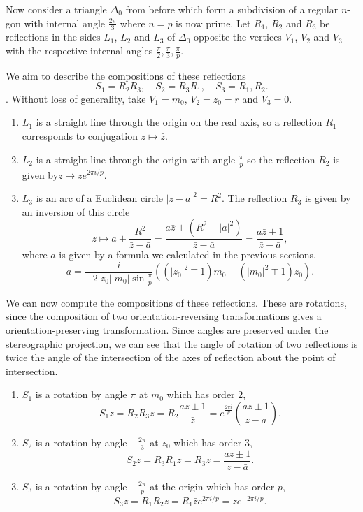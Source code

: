 \documentclass{article}
\begin{document}
Now consider a triangle \(\Delta_0\) from before which form a subdivision of a regular \(n\)-gon with internal angle \(\frac{2\pi}{3}\) where \(n = p\) is now prime. Let \(R_1\), \(R_2\) and \(R_3\) be reflections in the sides \(L_1\), \(L_2\) and \(L_3\) of \(\Delta_0\) opposite the vertices \(V_1\), \(V_2\) and \(V_3\) with the respective internal angles \(\frac{\pi}{2}, \frac{\pi}{3}, \frac{\pi}{p}\). 

We aim to describe the compositions of these reflections
\[ S_1 = R_2R_3, \quad S_2 = R_3R_1, \quad S_3 = R_1,R_2. \].
Without loss of generality, take \(V_1 = m_0\), \(V_2 = z_0 = r\) and \(V_3 = 0\). 
\begin{enumerate}
    \item \(L_1\) is a straight line through the origin on the real axis, so a reflection \(R_1\) corresponds to conjugation \(z \mapsto \bar{z}\). 

    \item \(L_2\) is a straight line through the origin with angle \(\frac{\pi}{p}\) so the reflection \(R_2\) is given by\(z \mapsto \bar{z}e^{2\pi i/p}\). 
    
    \item \(L_3\) is an arc of a Euclidean circle \(|z-a|^2 = R^2\). The reflection \(R_3\) is given by an inversion of this circle
    \[ z \mapsto a + \frac{R^2}{\bar{z} - \bar{a}} = \frac{a\bar{z} + (R^2 - |a|^2)}{\bar{z} - \bar{a}} = \frac{a\bar{z} \pm 1 }{\bar{z} - \bar{a}}, \]
    where \(a\) is given by a formula we calculated in the previous sections.
    \[ a = \frac{i}{-2|z_0||m_0|\sin\frac{\pi}{p}} ((|z_0|^2 \mp 1)m_0 - (|m_0|^2 \mp 1)z_0). \]
\end{enumerate}

We can now compute the compositions of these reflections. These are rotations, since the composition of two orientation-reversing transformations gives a orientation-preserving transformation. Since angles are preserved under the stereographic projection, we can see that the angle of rotation of two reflections is twice the angle of the intersection of the axes of reflection about the point of intersection.

\begin{enumerate}
    \item \(S_1\) is a rotation by angle \(\pi\) at \(m_0\) which has order \(2\),
    \[S_1z = R_2R_3z = R_2\frac{a\bar{z} \pm 1 }{\bar{z}} = e^{\frac{2\pi i}{p}} \left(\frac{\bar{a}z \pm 1}{z - a}\right). \] 
    \item \(S_2\) is a rotation by angle \(-\frac{2\pi}{3}\) at \(z_0\) which has order \(3\), 
    \[S_2z = R_3R_1z = R_3\bar{z} = \frac{az \pm 1}{z - \bar{a}}. \]
    \item \(S_3\) is a rotation by angle \(-\frac{2\pi}{p}\) at the origin which has order \(p\),
    \[S_3z = R_1R_2z = R_1\bar{z}e^{2\pi i/p} = ze^{-2\pi i/p}.\] 
\end{enumerate}
\end{document}
